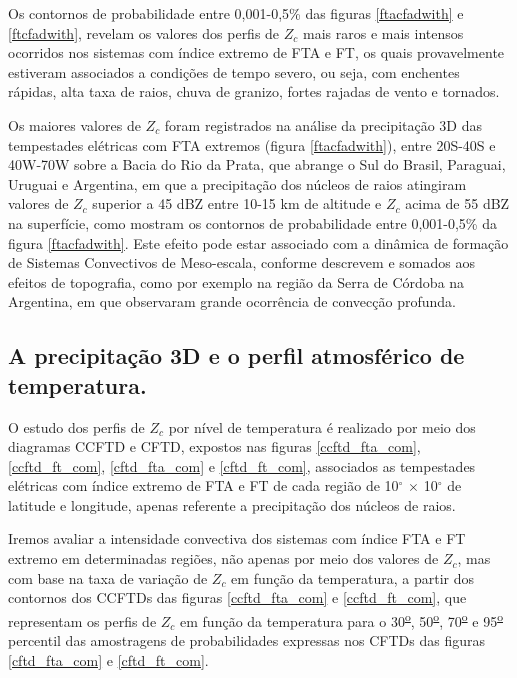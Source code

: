 Os contornos de probabilidade entre 0,001-0,5\% das figuras \ref{ftacfadwith} e \ref{ftcfadwith}, revelam os valores dos perfis de $Z_c$ mais raros e mais intensos ocorridos nos sistemas com índice extremo de FTA e FT, os quais provavelmente estiveram associados a condições de tempo severo, ou seja, com enchentes rápidas, alta taxa de raios, chuva de granizo, fortes rajadas de vento e tornados. 

Os maiores valores de $Z_c$ foram registrados na análise da precipitação 3D das tempestades elétricas com FTA extremos (figura \ref{ftacfadwith}), entre 20S-40S e 40W-70W sobre a Bacia do Rio da Prata, que abrange o Sul do Brasil, Paraguai, Uruguai e Argentina, em que a precipitação dos núcleos de raios atingiram valores de $Z_c$ superior a 45 dBZ entre 10-15 km de altitude e $Z_c$ acima de 55 dBZ na superfície, como mostram os contornos de probabilidade entre 0,001-0,5\% da figura \ref{ftacfadwith}. Este efeito pode estar associado com a dinâmica de formação de Sistemas Convectivos de Meso-escala, conforme descrevem  e  somados aos efeitos de topografia, como por exemplo na região da Serra de Córdoba na Argentina, em que  observaram grande ocorrência de convecção profunda.


\subsection{A precipitação 3D e o perfil atmosférico de temperatura.}

O estudo dos perfis de $Z_c$ por nível de temperatura é realizado por meio dos diagramas CCFTD e CFTD, expostos nas figuras \ref{ccftd_fta_com}, \ref{ccftd_ft_com}, \ref{cftd_fta_com} e \ref{cftd_ft_com}, associados as tempestades elétricas com índice extremo de FTA e FT de cada região de 10$^{\circ}$ $\times$ 10$^{\circ}$ de latitude e longitude, apenas referente a precipitação dos núcleos de raios.

Iremos avaliar a intensidade convectiva dos sistemas com índice  FTA e FT extremo em determinadas regiões, não apenas por meio dos valores de $Z_c$, mas com base na taxa de variação de $Z_{c}$ em função da temperatura, a partir dos contornos dos CCFTDs das figuras \ref{ccftd_fta_com} e \ref{ccftd_ft_com}, que representam os perfis de $Z_c$ em função da temperatura para o 30\textsuperscript{\underline{o}}, 50\textsuperscript{\underline{o}}, 70\textsuperscript{\underline{o}} e 95\textsuperscript{\underline{o}} percentil das amostragens de probabilidades expressas nos CFTDs das figuras \ref{cftd_fta_com} e \ref{cftd_ft_com}.	

